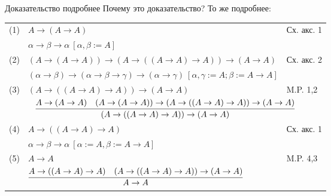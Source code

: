 \documentclass[aspectratio=169]{beamer}
\begin{document}
\begin{frame}{Доказательство подробнее}
Почему это доказательство? То же подробнее:\pause\vspace{0.2cm}

\begin{tabular}{lll}
(1) & $A \rightarrow (A \rightarrow A)$&Сх. акс. 1\\
    & {\color{cyan}$\alpha \rightarrow \beta \rightarrow \alpha\ [\alpha, \beta := A]$}

\vspace{0.2cm}\\\pause

(2) & $(A \rightarrow (A \rightarrow A)) \rightarrow 
  (A \rightarrow ((A \rightarrow A) \rightarrow A)) \rightarrow
  (A \rightarrow A)$&Сх. акс. 2\\
    & {\color{cyan}$(\alpha \rightarrow \beta) \rightarrow (\alpha \rightarrow \beta \rightarrow \gamma) 
       \rightarrow (\alpha \rightarrow \gamma)\ [\alpha, \gamma := A; \beta := A\rightarrow A]$}

\vspace{0.2cm}\\\pause

(3) & $(A \rightarrow ((A \rightarrow A) \rightarrow A)) \rightarrow
  (A \rightarrow A)$&M.P. 1,2\\
    \multicolumn{3}{c}{\color{cyan} $\infer{(A \rightarrow ((A \rightarrow A) \rightarrow A)) \rightarrow
  (A \rightarrow A)}{A \rightarrow (A \rightarrow A) & (A \rightarrow (A \rightarrow A)) \rightarrow 
  (A \rightarrow ((A \rightarrow A) \rightarrow A)) \rightarrow
  (A \rightarrow A)}$}

\vspace{0.2cm}\\\pause

(4) & $A \rightarrow ((A \rightarrow A) \rightarrow A)$ & Сх. акс. 1\\
    & {\color{cyan}$\alpha \rightarrow \beta \rightarrow \alpha\ [\alpha := A, \beta := A\rightarrow A]$}

\vspace{0.2cm}\\\pause

(5) & $A \rightarrow A$ & M.P. 4,3\\
    & {\color{cyan} $\infer{A \rightarrow A}{A \rightarrow ((A \rightarrow A) \rightarrow A) & 
       (A \rightarrow ((A \rightarrow A) \rightarrow A)) \rightarrow (A \rightarrow A)}$}

\vspace{0.2cm}
\end{tabular}
\end{frame}
\end{document}

